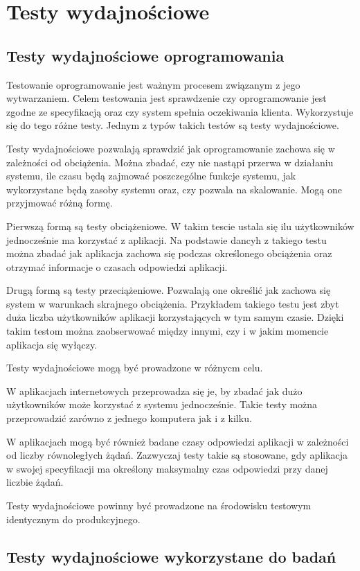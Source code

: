 \chapter{Testy wydajnościowe}
\section{Testy wydajnościowe oprogramowania}
 Testowanie oprogramowanie jest ważnym procesem związanym z jego wytwarzaniem.  Celem testowania jest sprawdzenie czy oprogramowanie jest zgodne ze specyfikacją oraz czy system spełnia oczekiwania klienta. Wykorzystuje się do tego różne  testy. Jednym z typów takich testów są testy wydajnościowe. 

Testy wydajnościowe pozwalają sprawdzić jak oprogramowanie zachowa się w zależności od obciążenia. Można zbadać, czy nie nastąpi przerwa w działaniu systemu, ile czasu będą zajmować poszczególne funkcje systemu, jak wykorzystane będą zasoby systemu oraz, czy pozwala na skalowanie. Mogą one przyjmować różną formę. 

Pierwszą formą są testy obciążeniowe. W takim tescie ustala się ilu użytkowników jednocześnie ma korzystać z aplikacji. Na podstawie dancyh z takiego testu można zbadać jak aplikacja zachowa się podczas określonego obciążenia oraz otrzymać informacje o czasach odpowiedzi aplikacji.

Drugą formą są testy przeciążeniowe. Pozwalają one określić jak zachowa się system w warunkach skrajnego obciążenia. Przykładem takiego testu jest zbyt duża liczba użytkowników aplikacji korzystających w tym samym czasie. Dzięki takim testom można zaobserwować między innymi, czy i w jakim momencie aplikacja się wyłączy.

Testy wydajnościowe mogą być prowadzone w różnycm celu.

W aplikacjach internetowych  przeprowadza się je, by zbadać jak dużo użytkowników może korzystać z systemu jednocześnie. Takie testy można przeprowadzić zarówno z jednego komputera jak i z kilku. 

W aplikacjach mogą być również badane czasy odpowiedzi aplikacji w zależności od liczby równoległych żądań. Zazwyczaj testy takie są stosowane, gdy aplikacja w swojej specyfikacji ma określony maksymalny czas odpowiedzi przy danej liczbie żądań.

Testy wydajnościowe powinny być prowadzone na środowisku testowym identycznym do produkcyjnego.

\section{Testy wydajnościowe wykorzystane do badań}

